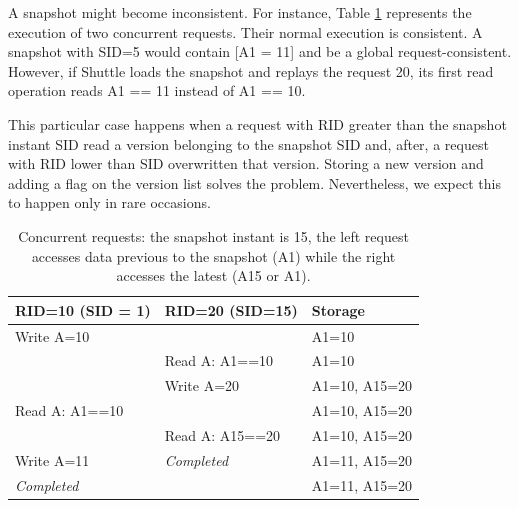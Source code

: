 A snapshot might become inconsistent. For instance, Table \ref{tab:snapshot_caso_bicudo} represents the execution of two concurrent requests. Their normal execution is consistent. A snapshot with \ac{SID}=5 would contain [A1 = 11] and be a global request-consistent. However, if Shuttle loads the snapshot and replays the request 20, its first read operation reads A1 == 11 instead of A1 == 10. 


This particular case happens when a request with \ac{RID} greater than the snapshot instant \ac{SID} read a version belonging to the snapshot \ac{SID} and, after, a request with \ac{RID} lower than \ac{SID} overwritten that version. Storing a new version and adding a flag on the version list solves the problem. Nevertheless, we expect this to happen only in rare occasions.



\begin{table}
\centering
\begin{tabular}{l|l|l}
\textbf{RID=10 (SID = 1)}     & \textbf{RID=20 (SID=15)}   & \textbf{Storage}\\ \hline
Write A=10                    & ~                          & A1=10  \\
~                             & Read A: A1==10             & A1=10  \\         
~                             & Write A=20                 & A1=10, A15=20 \\
Read A: A1==10                & ~                          & A1=10, A15=20 \\
~                             & Read A: A15==20            & A1=10, A15=20 \\
Write A=11                    & \textit{Completed}         & A1=11, A15=20 \\
\textit{Completed}            & ~                          & A1=11, A15=20 \\
\end{tabular}
\caption[Concurrent requests]{Concurrent requests: the snapshot instant is 15, the left request accesses data previous to the snapshot (A1) while the right accesses the latest (A15 or A1). }
\label{tab:snapshot_caso_bicudo}
\end{table}


